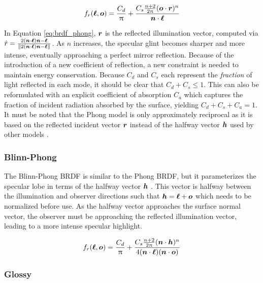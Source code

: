 \begin{equation} \label{eq:brdf_phong}
  f_r(\bm{\ell}, \bm{o}) = \frac{C_d}{\uppi} + \frac{C_s \frac{n+2}{2\uppi} (\bm{o} \cdot \bm{r})^n}{\bm{n} \cdot \bm{\ell}}
\end{equation}

In Equation \ref{eq:brdf_phong}, $\bm{r}$ is the reflected illumination vector, computed via $\hat{r} = \frac{2 (\bm{n} \cdot \bm{\ell}) \bm{n} - \bm{\ell}}{\| 2 (\bm{n} \cdot \bm{\ell}) \bm{n} - \bm{\ell} \|}$. As $n$ increases, the specular glint becomes sharper and more intense, eventually approaching a perfect mirror reflection. Because of the introduction of a new coefficient of reflection, a new constraint is needed to maintain energy conservation. Because $C_d$ and $C_s$ each represent the \textit{fraction} of light reflected in each mode, it should be clear that $C_d + C_s \leq 1$. This can also be reformulated with an explicit coefficient of absorption $C_a$ which captures the fraction of incident radiation absorbed by the surface, yielding $C_d + C_s + C_a = 1$. It must be noted that the Phong model is only approximately reciprocal as it is based on the reflected incident vector $\bm{r}$ instead of the halfway vector $\bm{h}$ used by other models \cite{duvenhage2013}.

\subsubsection{Blinn-Phong}

The Blinn-Phong BRDF is similar to the Phong BRDF, but it parameterizes the specular lobe in terms of the halfway vector $\bm{h}$ \cite{duvenhage2013}. This vector is halfway between the illumination and observer directions such that $\bm{h} = \bm{\ell} + \bm{o}$ which needs to be normalized before use. As the halfway vector approaches the surface normal vector, the observer must be approaching the reflected illumination vector, leading to a more intense specular highlight. 

\begin{equation} \label{eq:brdf_blinn_phong}
  f_r(\bm{\ell}, \bm{o}) = \frac{C_d}{\uppi} + \frac{C_s \frac{n+2}{2\uppi} (\bm{n} \cdot \bm{h})^n}{4 (\bm{n} \cdot \bm{\ell})(\bm{n} \cdot \bm{o})}
\end{equation}

\subsubsection{Glossy}

